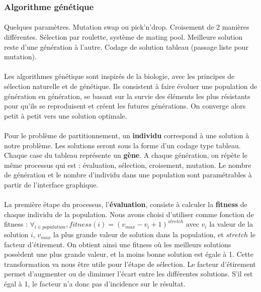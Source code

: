 \documentclass[12pt]{article}
\begin{document}
\subsubsection{Algorithme génétique}

\paragraph{}Quelques paramètres. Mutation swap ou pick'n'drop. Croisement de 2 manières différentes. Sélection par roulette, système de mating pool. Meilleure solution reste d'une génération à l'autre. Codage de solution tableau (passage liste pour mutation).

\paragraph{}Les algorithmes génétique sont inspirés de la biologie, avec les principes de sélection naturelle et de génétique. Ils consistent à faire évoluer une population de génération en génération, se basant sur la survie des éléments les plus résistants pour qu'ils se reproduisent et créent les futures générations. On converge alors petit à petit vers une solution optimale.

\paragraph{}Pour le problème de partitionnement, un \textbf{individu} correspond à une solution à notre problème. Les solutions seront sous la forme d'un codage type tableau. Chaque case du tableau représente un \textbf{gène}. A chaque génération, on répète le même processus qui est : évaluation, sélection, croisement, mutation. Le nombre de génération et le nombre d'individu dans une population sont paramétrables à partir de l'interface graphique.

\paragraph{}La première étape du processus, l'\textbf{évaluation}, consiste à calculer la \textbf{fitness} de chaque individu de la population. Nous avons choisi d'utiliser comme fonction de fitness : $\forall_{i \in population}, fitness(i) = \left(v_{max} - v_i + 1\right)^{stretch}$ avec $v_i$ la valeur de la solution $i$, $v_{max}$ la plus grande valeur de solution dans la population, et $stretch$ le facteur d'étirement. On obtient ainsi une fitness où les meilleurs solutions possèdent une plus grande valeur, et la moins bonne solution est égale à 1. Cette transformation va nous être utile pour l'étape de sélection. Le facteur d'étirement permet d'augmenter ou de diminuer l'écart entre les différentes solutions. S'il est égal à 1, le facteur n'a donc pas d'incidence sur le résultat.
\end{document}
